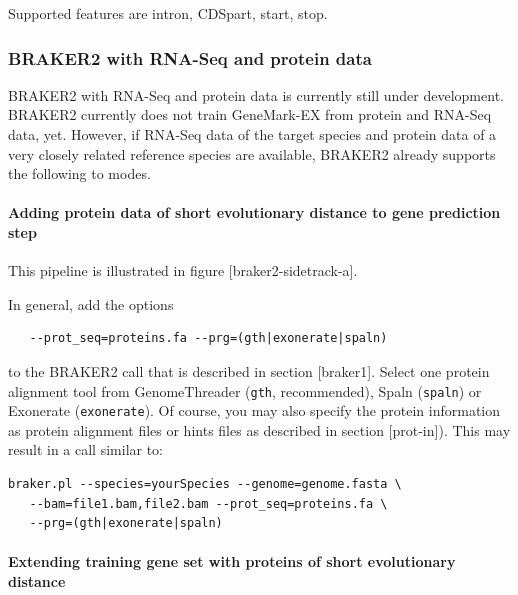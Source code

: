 \documentclass[]{article}
\let\oldparagraph\paragraph
\renewcommand{\paragraph}[1]{\oldparagraph{#1}\mbox{}}
\begin{document}
Supported features are intron, CDSpart, start, stop.

\hypertarget{braker2-with-rna-seq-and-protein-data}{\subsubsection{BRAKER2
with RNA-Seq and protein
data}\label{braker2-with-rna-seq-and-protein-data}}

BRAKER2 with RNA-Seq and protein data is currently still under
development. BRAKER2 currently does not train GeneMark-EX from protein
and RNA-Seq data, yet. However, if RNA-Seq data of the target species
and protein data of a very closely related reference species are
available, BRAKER2 already supports the following to modes.

\paragraph{Adding protein data of short evolutionary distance to gene
prediction
step}\label{adding-protein-data-of-short-evolutionary-distance-to-gene-prediction-step}

This pipeline is illustrated in figure {[}braker2-sidetrack-a{]}.

In general, add the options

\begin{verbatim}
   --prot_seq=proteins.fa --prg=(gth|exonerate|spaln)
\end{verbatim}

to the BRAKER2 call that is described in section {[}braker1{]}. Select
one protein alignment tool from GenomeThreader (\texttt{gth},
recommended), Spaln (\texttt{spaln}) or Exonerate (\texttt{exonerate}).
Of course, you may also specify the protein information as protein
alignment files or hints files as described in section {[}prot-in{]}).
This may result in a call similar to:

\begin{verbatim}
braker.pl --species=yourSpecies --genome=genome.fasta \
   --bam=file1.bam,file2.bam --prot_seq=proteins.fa \
   --prg=(gth|exonerate|spaln)
\end{verbatim}

\paragraph{Extending training gene set with proteins of short
evolutionary
distance}\label{extending-training-gene-set-with-proteins-of-short-evolutionary-distance}
\end{document}
